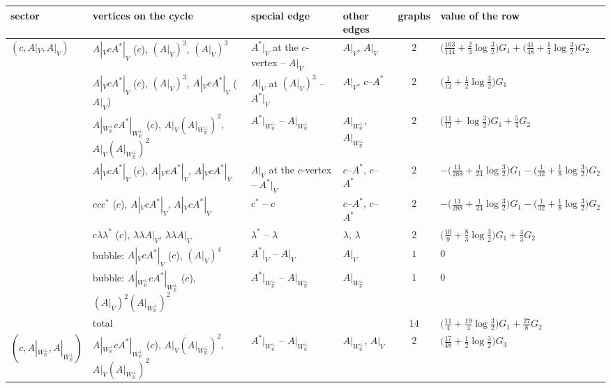 \begin{tabular}{l|l|l|l|c|l}
sector & vertices on the cycle & special edge & other edges & graphs & value of the row \\
\hline
$(c,A|_V,A|_V)$ & $A|_VcA^*|_V$ ($c$), $(A|_V)^3$, $(A|_V)^3$ & $A^*|_V$ at the $c$-vertex -- $A|_V$ & $A|_V$, $A|_V$ & $2$ & $\big(\tfrac{103}{144}+\tfrac23\log\tfrac32\big)G_1+\big(\tfrac{41}{48}+\tfrac14\log\tfrac32\big)G_2$ \\
 & $A|_VcA^*|_V$ ($c$), $(A|_V)^3$, $A|_VcA^*|_V$ ($A|_V$) & $A|_V$ at $(A|_V)^3$ -- $A^*|_V$ & $A|_V$, $c$--$A^*$ & $2$ & $\big(\tfrac1{12}+\tfrac12\log\tfrac32\big)G_1$ \\
 & $A|_{W_{\mathbb R}^\perp}cA^*|_{W_{\mathbb R}^\perp}$ ($c$), $A|_V(A|_{W_{\mathbb R}^\perp})^2$, $A|_V(A|_{W_{\mathbb R}^\perp})^2$ & $A^*|_{W_{\mathbb R}^\perp}$ -- $A|_{W_{\mathbb R}^\perp}$ & $A|_{W_{\mathbb R}^\perp}$, $A|_{W_{\mathbb R}^\perp}$ & $2$ & $\big(\tfrac{11}{12}+\log\tfrac32\big)G_1+\tfrac54G_2$ \\
 & $A|_VcA^*|_V$ ($c$), $A|_VcA^*|_V$, $A|_VcA^*|_V$ & $A|_V$ at the $c$-vertex -- $A^*|_V$ & $c$--$A^*$, $c$--$A^*$ & $2$ & $-\big(\tfrac{11}{288}+\tfrac1{24}\log\tfrac32\big)G_1-\big(\tfrac1{32}+\tfrac18\log\tfrac32\big)G_2$ \\
 & $ccc^*$ ($c$), $A|_VcA^*|_V$, $A|_VcA^*|_V$ & $c^*$ -- $c$ & $c$--$A^*$, $c$--$A^*$ & $2$ & $-\big(\tfrac{11}{288}+\tfrac1{24}\log\tfrac32\big)G_1-\big(\tfrac1{32}+\tfrac18\log\tfrac32\big)G_2$ \\
 & $c\lambda\lambda^*$ ($c$), $\lambda\lambda A|_V$, $\lambda\lambda A|_V$ & $\lambda^*$ -- $\lambda$ & $\lambda$, $\lambda$ & $2$ & $\big(\tfrac{10}9+\tfrac83\log\tfrac32\big)G_1+\tfrac43G_2$ \\
 & bubble: $A|_VcA^*|_V$ ($c$), $(A|_V)^4$ & $A^*|_V$ -- $A|_V$ & $A|_V$ & $1$ & $0$ \\
 & bubble: $A|_{W_{\mathbb R}^\perp}cA^*|_{W_{\mathbb R}^\perp}$ ($c$), $(A|_V)^2(A|_{W_{\mathbb R}^\perp})^2$ & $A^*|_{W_{\mathbb R}^\perp}$ -- $A|_{W_{\mathbb R}^\perp}$ & $A|_{W_{\mathbb R}^\perp}$ & $1$ & $0$ \\
 & total & & & $14$ & $\big(\tfrac{11}4+\tfrac{19}4\log\tfrac32\big)G_1+\tfrac{27}8G_2$ \\
\hline
$(c,A|_{W_{\mathbb R}^\perp},A|_{W_{\mathbb R}^\perp})$ & $A|_{W_{\mathbb R}^\perp}cA^*|_{W_{\mathbb R}^\perp}$ ($c$), $A|_V(A|_{W_{\mathbb R}^\perp})^2$, $A|_V(A|_{W_{\mathbb R}^\perp})^2$ & $A^*|_{W_{\mathbb R}^\perp}$ -- $A|_{W_{\mathbb R}^\perp}$ & $A|_{W_{\mathbb R}^\perp}$, $A|_V$ & $2$ & $\big(\tfrac{17}{48}+\tfrac12\log\tfrac32\big)G_3$ \\

\end{tabular}
